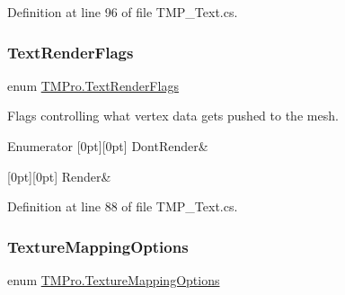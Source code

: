Definition at line 96 of file T\+M\+P\+\_\+\+Text.\+cs.

\mbox{\label{namespace_t_m_pro_ac5a571bdd8e4873a73f2c05b62feff0e}} 
\subsubsection{\texorpdfstring{TextRenderFlags}{TextRenderFlags}}
{\footnotesize\ttfamily enum \mbox{\hyperlink{namespace_t_m_pro_ac5a571bdd8e4873a73f2c05b62feff0e}{T\+M\+Pro.\+Text\+Render\+Flags}}\hspace{0.3cm}{\ttfamily [strong]}}



Flags controlling what vertex data gets pushed to the mesh. 

\begin{DoxyEnumFields}{Enumerator}
[0pt][0pt]{}\mbox{\label{namespace_t_m_pro_ac5a571bdd8e4873a73f2c05b62feff0ea8d8877558d80d9020a901ed9768c89ec}} 
Dont\+Render&\\
\hline

[0pt][0pt]{}\mbox{\label{namespace_t_m_pro_ac5a571bdd8e4873a73f2c05b62feff0ea5e520da5341f2fec6d3bbfe7ef357922}} 
Render&\\
\hline

\end{DoxyEnumFields}


Definition at line 88 of file T\+M\+P\+\_\+\+Text.\+cs.

\mbox{\label{namespace_t_m_pro_ab5c7877e6f736cba8b501c877bf5b612}} 
\subsubsection{\texorpdfstring{TextureMappingOptions}{TextureMappingOptions}}
{\footnotesize\ttfamily enum \mbox{\hyperlink{namespace_t_m_pro_ab5c7877e6f736cba8b501c877bf5b612}{T\+M\+Pro.\+Texture\+Mapping\+Options}}\hspace{0.3cm}{\ttfamily [strong]}}

